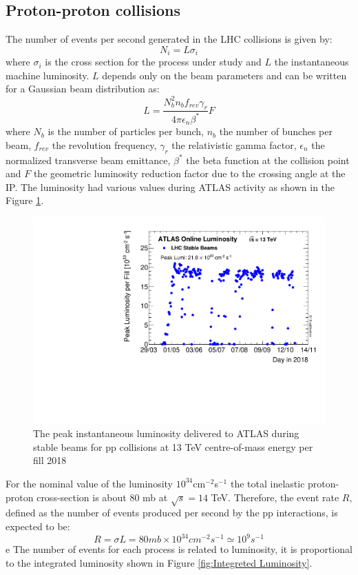 \documentclass[a4paper, oneside, 11pt, openright]{book}
\begin{document}
				\subsection{Proton-proton collisions}
					The number of events per second generated in the LHC collisions is given by:
					$$
					N_{i} = L\sigma_{i}
					$$
					where $\sigma_{i}$ is the cross section for the process under study and $L$ the instantaneous machine luminosity. $L$ depends only on the beam parameters and can be written for a Gaussian beam distribution as: 
					$$
					L = \frac{N_b^2n_bf_{rev}\gamma_r}{4\pi\epsilon_n\beta^*}F
					$$
					where $N_b$ is the number of particles per bunch, $n_b$ the number of bunches per beam, $f_{rev}$ the revolution frequency, $\gamma_r$ the relativistic gamma factor, $\epsilon_n$ the normalized transverse beam emittance, $\beta^*$ the beta function at the collision point and $F$ the geometric luminosity reduction factor due to the crossing angle at the IP. The luminosity had various values during ATLAS activity as shown in the Figure \ref{fig:lum}.
					
					\begin{figure}
						\centering
						\includegraphics[width=0.5\textheight]{tesi_images/insta_lum_2018.pdf}
						\caption{The peak instantaneous luminosity delivered to ATLAS during stable beams for pp collisions at 13 TeV centre-of-mass energy per fill 2018}
						\label{fig:lum}
					\end{figure}
					
					For the nominal value of the luminosity $10^{34}$cm$^{-2}$s$^{-1}$ the total inelastic proton-proton cross-section is about 80 mb \cite{LHC introduction}  at $\sqrt{s} = 14$ TeV. Therefore, the event rate $R$, defined as the number of events produced per second by the pp interactions, is expected to be:
					$$
					R = \sigma L = 80 mb\times10^{34}cm^{-2}s^{-1} \simeq 10^{9}s^{-1}
					$$e 
					The number of events for each process is related to luminosity, it is proportional to the integrated luminosity shown in Figure \ref{fig:Integreted Luminosity}.
					
\end{document}
